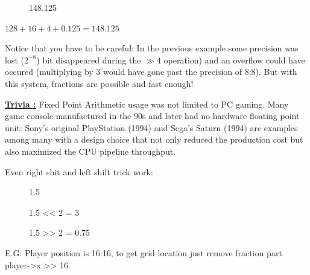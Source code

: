 \begin{figure}[H]
 \centering
   
   \caption{148.125} 
\end{figure} 
$128 + 16 + 4 + 0.125 = 148.125 $


Notice that you have to be careful: In the previous example some precision was lost ($ 2^{-8}$) bit disappeared during the $\gg 4$ operation) and an overflow could have occured (multiplying by 3 would have gone past the precision of 8:8). But with this system, fractions are possible and fast enough!\\
\par
\begin{minipage}{\textwidth}
 
 \end{minipage}
\par
 \textbf{\underline{Trivia :}}  Fixed Point Arithmetic usage was not limited to PC gaming. Many game console manufactured in the 90s and later had no hardware floating point unit: Sony's original PlayStation (1994) and Sega's Saturn (1994) are examples among many with a design choice that not only reduced the production cost but also maximized the CPU pipeline throughput.
 
 Even right shit and left shift trick work:\\
 
 \par
\begin{figure}[H]
 \centering
   
   \caption{1.5} 
\end{figure} 

\par
\begin{figure}[H]
 \centering
   
   \caption{1.5 << 2  = 3} 
\end{figure}

\par
\begin{figure}[H]
 \centering
   
   \caption{1.5 >> 2 = 0.75} 
\end{figure}


 

 E.G: Player position is 16:16, to get grid location just remove fraction part player->x >> 16.
 
 



